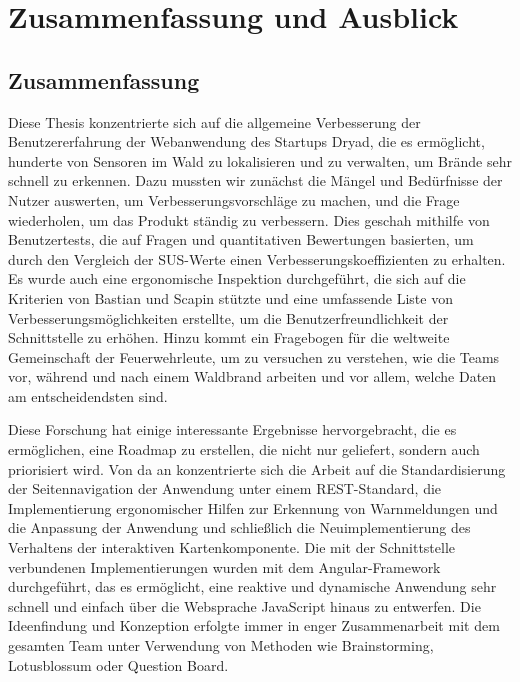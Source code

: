 \chapter{Zusammenfassung und Ausblick} \label{chap:conclusion}

\section{Zusammenfassung}

Diese Thesis konzentrierte sich auf die allgemeine Verbesserung der Benutzererfahrung der Webanwendung des Startups Dryad, die es ermöglicht, hunderte von Sensoren im Wald zu lokalisieren und zu verwalten, um Brände sehr schnell zu erkennen.
Dazu mussten wir zunächst die Mängel und Bedürfnisse der Nutzer auswerten, um Verbesserungsvorschläge zu machen, und die Frage wiederholen, um das Produkt ständig zu verbessern.
Dies geschah mithilfe von Benutzertests, die auf Fragen und quantitativen Bewertungen basierten, um durch den Vergleich der \ac{SUS}-Werte einen Verbesserungskoeffizienten zu erhalten.
Es wurde auch eine ergonomische Inspektion durchgeführt, die sich auf die Kriterien von Bastian und Scapin stützte und eine umfassende Liste von Verbesserungsmöglichkeiten erstellte, um die Benutzerfreundlichkeit der Schnittstelle zu erhöhen.
Hinzu kommt ein Fragebogen für die weltweite Gemeinschaft der Feuerwehrleute, um zu versuchen zu verstehen, wie die Teams vor, während und nach einem Waldbrand arbeiten und vor allem, welche Daten am entscheidendsten sind.

Diese Forschung hat einige interessante Ergebnisse hervorgebracht, die es ermöglichen, eine Roadmap zu erstellen, die nicht nur geliefert, sondern auch priorisiert wird.
Von da an konzentrierte sich die Arbeit auf die Standardisierung der Seitennavigation der Anwendung unter einem REST-Standard, die Implementierung ergonomischer Hilfen zur Erkennung von Warnmeldungen und die Anpassung der Anwendung und schließlich die Neuimplementierung des Verhaltens der interaktiven Kartenkomponente.
Die mit der Schnittstelle verbundenen Implementierungen wurden mit dem Angular-Framework durchgeführt, das es ermöglicht, eine reaktive und dynamische Anwendung sehr schnell und einfach über die Websprache JavaScript hinaus zu entwerfen.
Die Ideenfindung und Konzeption erfolgte immer in enger Zusammenarbeit mit dem gesamten Team unter Verwendung von Methoden wie Brainstorming, Lotusblossum oder Question Board.

